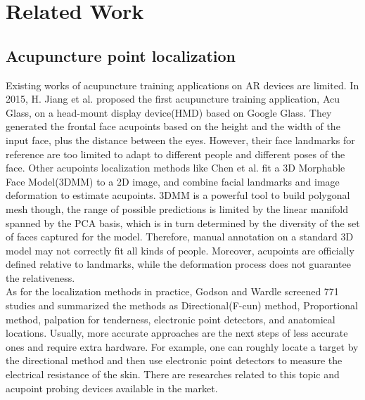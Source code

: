 \section{Related Work}
\label{sec:related-work}
\subsection{Acupuncture point localization}
\label{sec:related-acu-localize}
Existing works of acupuncture training applications on AR devices are limited. In 2015, H. Jiang et al.\cite{li2015acupoint} proposed the first acupuncture training application, Acu Glass, on a head-mount display device(HMD) based on Google Glass. They generated the frontal face acupoints based on the height and the width of the input face, plus the distance between the eyes. However, their face landmarks for reference are too limited to adapt to different people and different poses of the face. Other acupoints localization methods like Chen et al.\cite{chen2017localization}\cite{lan2018toward} fit a 3D Morphable Face Model(3DMM)\cite{huber2016multiresolution} to a 2D image, and combine facial landmarks and image deformation to estimate acupoints. 3DMM is a powerful tool to build polygonal mesh though, the range of possible predictions is limited by the linear manifold spanned by the PCA basis, which is in turn determined by the diversity of the set of faces captured for the model\cite{kartynnik2019real}. Therefore, manual annotation on a standard 3D model may not correctly fit all kinds of people. Moreover, acupoints are officially defined relative to landmarks, while the deformation process does not guarantee the relativeness.\\
As for the localization methods in practice, Godson and Wardle\cite{godson2019accuracy} screened 771 studies and summarized the methods as Directional(F-cun) method, Proportional method, palpation for tenderness, electronic point detectors, and anatomical locations. Usually, more accurate approaches are the next steps of less accurate ones and require extra hardware. For example, one can roughly locate a target by the directional method and then use electronic point detectors to measure the electrical resistance of the skin. There are researches related to this topic and acupoint probing devices available in the market.

